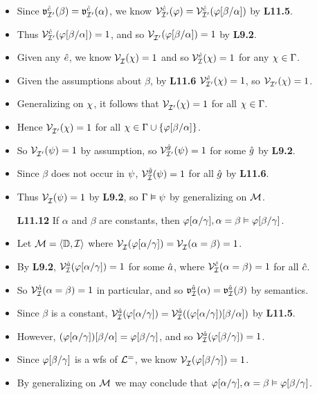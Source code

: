 \documentclass[a4paper, 11pt]{article} %
\begin{document}
\begin{itemize}
    \item Since $\mathfrak{v}_{\mathcal{I}'}^{\hat{c}}(\beta)=\mathfrak{v}_{\mathcal{I}'}^{\hat{c}}(\alpha)$, we know $\mathcal{V}_{\mathcal{I}'}^{\hat{c}}(\varphi)=\mathcal{V}_{\mathcal{I}'}^{\hat{c}}(\varphi[\beta/\alpha])$ by \textbf{L11.5}. 
    \item Thus $\mathcal{V}_{\mathcal{I}'}^{\hat{c}}(\varphi[\beta/\alpha])=1$, and so $\mathcal{V}_{\mathcal{I}'}^{}(\varphi[\beta/\alpha])=1$ by \textbf{L9.2}.
    \item Given any $\hat{e}$, we know $\mathcal{V}_{\mathcal{I}}^{}(\chi) = 1$ and so $\mathcal{V}_{\mathcal{I}}^{\hat{e}}(\chi) = 1$ for any $\chi \in \Gamma$.
    \item Given the assumptions about $\beta$, by \textbf{L11.6} $\mathcal{V}_{\mathcal{I}'}^{\hat{e}}(\chi) = 1$, so $\mathcal{V}_{\mathcal{I}'}^{}(\chi) = 1$.
    \item Generalizing on $\chi$, it follows that $\mathcal{V}_{\mathcal{I}'}^{}(\chi) = 1$ for all $\chi \in \Gamma$.
    \item Hence $\mathcal{V}_{\mathcal{I}'}^{}(\chi) = 1$ for all $\chi \in \Gamma \cup \lbrace\varphi[\beta/\alpha]\rbrace$.
    \item So $\mathcal{V}_{\mathcal{I}'}^{}(\psi) = 1$ by assumption, so $\mathcal{V}_{\mathcal{I}'}^{\hat{g}}(\psi)=1$ for some $\hat{g}$ by \textbf{L9.2}.
    \item Since $\beta$ does not occur in $\psi$, $\mathcal{V}_{\mathcal{I}}^{\hat{g}}(\psi)=1$ for all $\hat{g}$ by \textbf{L11.6}.
    \item Thus $\mathcal{V}_{\mathcal{I}}^{}(\psi)=1$ by \textbf{L9.2}, so $\Gamma \vDash \psi$ by generalizing on $\mathcal{M}$.
  \item[\bf L11.12] If $\alpha$ and $\beta$ are constants, then $\varphi[\alpha/\gamma], \alpha = \beta \vDash \varphi[\beta/\gamma]$.
    \item Let $\mathcal{M}=\langle\mathbb{D},\mathcal{I}\rangle$ where $\mathcal{V}_{\mathcal{I}}^{}(\varphi[\alpha/\gamma]) = \mathcal{V}_{\mathcal{I}}^{}(\alpha = \beta) = 1$. 
    \item By \textbf{L9.2}, $\mathcal{V}_{\mathcal{I}}^{\hat{a}}(\varphi[\alpha/\gamma])=1$ for some $\hat{a}$, where $\mathcal{V}_{\mathcal{I}}^{\hat{c}}(\alpha=\beta)=1$ for all $\hat{c}$.
    \item So $\mathcal{V}_{\mathcal{I}}^{\hat{a}}(\alpha=\beta)=1$ in particular, and so $\mathfrak{v}_{\mathcal{I}}^{\hat{a}}(\alpha)=\mathfrak{v}_{\mathcal{I}}^{\hat{a}}(\beta)$ by semantics.
    \item Since $\beta$ is a constant, $\mathcal{V}_{\mathcal{I}}^{\hat{a}}(\varphi[\alpha/\gamma]) = \mathcal{V}_{\mathcal{I}}^{\hat{a}}((\varphi[\alpha/\gamma])[\beta/\alpha])$ by \textbf{L11.5}.
    \item However, $(\varphi[\alpha/\gamma])[\beta/\alpha]=\varphi[\beta/\gamma]$, and so $\mathcal{V}_{\mathcal{I}}^{\hat{a}}(\varphi[\beta/\gamma])=1$.
    \item Since $\varphi[\beta/\gamma]$ is a wfs of $\mathcal{L}^=$, we know $\mathcal{V}_{\mathcal{I}}^{}(\varphi[\beta/\gamma])=1$. 
    \item By generalizing on $\mathcal{M}$ we may conclude that $\varphi[\alpha/\gamma], \alpha = \beta \vDash \varphi[\beta/\gamma]$. 
\end{itemize}
\end{document}
